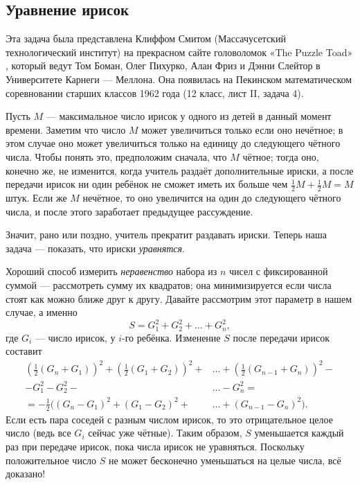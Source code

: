 \subsection*{Уравнение ирисок}

Эта задача была представлена Клиффом Смитом (Массачусетский технологический институт) на прекрасном сайте головоломок «The Puzzle Toad» \cite{bohman-pikhurko-frieze-sleator}, который ведут Том Боман, Олег Пихурко, Алан Фриз и Дэнни Слейтор в Университете Карнеги — Меллона.
Она появилась на Пекинском математическом соревновании старших классов 1962 года (12 класс, лист II, задача 4).

Пусть $M$ --- максимальное число ирисок у одного из детей в данный момент времени.
Заметим что число $M$ может увеличиться только если оно нечётное;
в этом случае оно может увеличиться только на единицу до следующего чётного числа.
Чтобы понять это, предположим сначала, что $M$ чётное; тогда оно, конечно же, не изменится, когда учитель раздаёт дополнительные ириски, а после передачи ирисок ни один ребёнок не сможет иметь их больше чем $\tfrac12 M + \tfrac12 M = M$ штук.
Если же $M$ нечётное, то оно увеличится на один до следующего чётного числа, и после этого заработает предыдущее рассуждение.

Значит, рано или поздно, учитель прекратит раздавать ириски.
Теперь наша задача --- показать, что ириски \emph{уравнятся}.

Хороший способ измерить \emph{неравенство} набора из $n$ чисел с фиксированной суммой --- рассмотреть сумму их квадратов; она минимизируется если числа стоят как можно ближе друг к другу.
Давайте рассмотрим этот параметр в нашем случае, а именно 
\[S = G^2_1 + G^2_2 + \dots + G^2_n,\]
где $G_i$ --- число ирисок, у $i$-го ребёнка.
Изменение $S$ после передачи ирисок составит
\begin{align*}
\left(\tfrac{1}{2}(G_n+G_1)\right)^2+\left(\tfrac{1}{2}(G_1+G_2)\right)^2+&\dots+\left(\tfrac{1}{2}(G_{n-1}+G_n)\right)^2-
\\
-G_1^2-G_2^2-&\dots-G_n^2=
\\
=-\tfrac12\bigl((G_n-G_1)^2+(G_1-G_2)^2+&\dots+(G_{n-1}-G_n)^2\bigr).
\end{align*}
Если есть пара соседей с разным числом ирисок, то это отрицательное целое число (ведь все $G_i$ сейчас уже чётные).
Таким образом, $S$ уменьшается каждый раз при передаче ирисок, пока числа ирисок не уравняться.
Поскольку положительное число $S$ не может бесконечно уменьшаться на целые числа, всё доказано!

